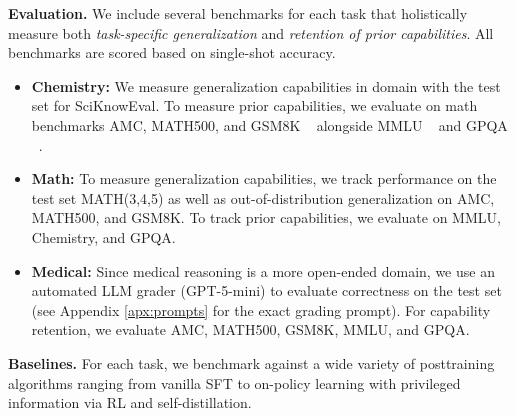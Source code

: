 \documentclass{article}
\renewcommand{\paragraph}[1]{\vspace{.1em}\noindent\textbf{#1}}
\begin{document}
\paragraph{Evaluation.} We include several benchmarks for each task that holistically measure both \textit{task-specific generalization} and \textit{retention of prior capabilities}. All benchmarks are scored based on {single-shot accuracy}.
\vspace{-8pt}


\begin{itemize}[leftmargin=*]
 \item \textbf{Chemistry:} We measure generalization capabilities in domain with the test set for SciKnowEval. To measure prior capabilities, we evaluate on math benchmarks AMC, MATH500, and GSM8K ~\citep{cobbe2021training} alongside MMLU ~\citep{hendrycks2020measuring} and GPQA ~\citep{rein2024gpqa}.
 
    \item \textbf{Math:} To measure generalization capabilities, we track performance on the test set MATH(3,4,5) as well as out-of-distribution generalization on AMC, MATH500, and GSM8K. To track prior capabilities, we evaluate on MMLU, Chemistry, and GPQA. 

     \item \textbf{Medical:} Since medical reasoning is a more open-ended domain, we use an automated LLM grader (GPT-5-mini) to evaluate correctness on the test set (see Appendix \ref{apx:prompts} for the exact grading prompt). For capability retention, we evaluate AMC, MATH500, GSM8K, MMLU, and GPQA.    
\end{itemize}


\textbf{Baselines.} For each task, we benchmark against a wide variety of posttraining algorithms ranging from vanilla SFT to on-policy learning with privileged information via RL and self-distillation. 
\vspace{-7pt}
\end{document}
